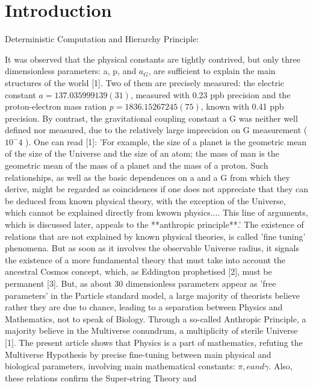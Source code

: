 
\chapter{Introduction}

Deterministic Computation and Hierarchy Principle:
\begin{center}
It was observed that the physical constants are tightly contrived, but only three dimensionless
parameters: a, p, and $a_{G}$, are sufficient to explain the main structures of the world [1]. Two of them
are precisely measured: the electric constant $a = 137.035999139(31)$, measured with 0.23 ppb
precision and the proton-electron mass ration $p = 1836.15267245(75)$, known with 0.41 ppb
precision. By contrast, the gravitational coupling constant a G was neither well defined nor
measured, due to the relatively large imprecision on G measurement ($10^-4$ ).
One can read [1]: 'For example, the size of a planet is the geometric mean of the size of the
Universe and the size of an atom; the mass of man is the geometric mean of the mass of a planet
and the mass of a proton. Such relationships, as well as the basic dependences on a and a G from
which they derive, might be regarded as coincidences if one does not appreciate that they can be
deduced from known physical theory, with the exception of the Universe, which cannot be explained
directly from kwown physics.... This line of arguments, which is discussed later, appeals to the
**anthropic principle**.'
The existence of relations that are not explained by known physical theories, is called 'fine
tuning' phenomena. But as soon as it involves the observable Universe radius, it signals the
existence of a more fundamental theory that must take into account the ancestral Cosmos concept,
which, as Eddington prophetised [2], must be permanent [3].
But, as about 30 dimensionless parameters appear as 'free parameters' in the Particle standard
model, a large majority of theorists believe rather they are due to chance, leading to a separation
between Physics and Mathematics, not to speak of Biology. Through a so-called Anthropic
Principle, a majority believe in the Multiverse conundrum, a multiplicity of sterile Universe [1].
The present article shows that Physics is a part of mathematics, refuting the Multiverse
Hypothesis by precise fine-tuning between main physical and biological parameters, involving
main mathematical constants: $\pi, e and \gamma $. Also, these relations confirm the Super-string Theory and

\end{center}
